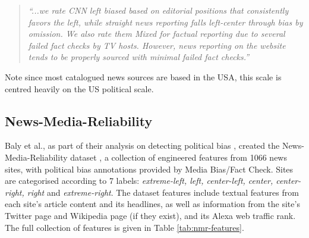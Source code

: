 \begin{quote}
\textit{``...we rate CNN left biased based on editorial positions that consistently favors the left, while straight news reporting falls left-center through bias by omission. We also rate them Mixed for factual reporting due to several failed fact checks by TV hosts. However, news reporting on the website tends to be properly sourced with minimal failed fact checks.''} \cite{MBFC-CNN}
\end{quote}

Note since most catalogued news sources are based in the USA, this scale is centred heavily on the US political scale.

\subsection{News-Media-Reliability} \label{subsec:news-media-reliability}

Baly et al., as part of their analysis on detecting political bias \cite{baly-emnlp18}, created the News-Media-Reliability dataset \cite{news-media-reliability}, a collection of engineered features from 1066 news sites, with political bias annotations provided by Media Bias/Fact Check. Sites are categorised according to 7 labels: \textit{extreme-left, left, center-left, center, center-right, right} and \textit{extreme-right}. The dataset features include textual features from each site's article content and its headlines, as well as information from the site's Twitter page and Wikipedia page (if they exist), and its Alexa web traffic rank. The full collection of features is given in Table \ref{tab:nmr-features}.

